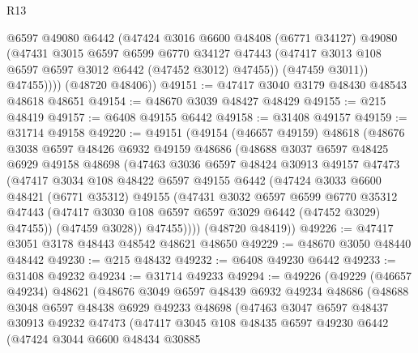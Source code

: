 \begin{lexlean}{R13}
\begin{coremodule}
              @6597
              @49080
              @6442
              (@47424
                @3016
                @6600
                @48408
                (@6771 @34127)
                @49080
                (@47431
                  @3015
                  @6597
                  @6599
                  @6770
                  @34127
                  @47443
                  (@47417 @3013 @108 @6597 @6597 @3012 @6442 (@47452 @3012) @47455))
                (@47459 @3011))
              @47455))))
      (@48720 @48406))
@49151 := @47417 @3040 @3179 @48430 @48543 @48618 @48651
@49154 := @48670 @3039 @48427 @48429
@49155 := @215 @48419
@49157 := @6408 @49155 @6442
@49158 := @31408 @49157
@49159 := @31714 @49158
@49220 := @49151
    (@49154
      (@46657 @49159)
      @48618
      (@48676
        @3038
        @6597
        @48426
        @6932
        @49159
        @48686
        (@48688
          @3037
          @6597
          @48425
          @6929
          @49158
          @48698
          (@47463
            @3036
            @6597
            @48424
            @30913
            @49157
            @47473
            (@47417
              @3034
              @108
              @48422
              @6597
              @49155
              @6442
              (@47424
                @3033
                @6600
                @48421
                (@6771 @35312)
                @49155
                (@47431
                  @3032
                  @6597
                  @6599
                  @6770
                  @35312
                  @47443
                  (@47417 @3030 @108 @6597 @6597 @3029 @6442 (@47452 @3029) @47455))
                (@47459 @3028))
              @47455))))
      (@48720 @48419))
@49226 := @47417 @3051 @3178 @48443 @48542 @48621 @48650
@49229 := @48670 @3050 @48440 @48442
@49230 := @215 @48432
@49232 := @6408 @49230 @6442
@49233 := @31408 @49232
@49234 := @31714 @49233
@49294 := @49226
    (@49229
      (@46657 @49234)
      @48621
      (@48676
        @3049
        @6597
        @48439
        @6932
        @49234
        @48686
        (@48688
          @3048
          @6597
          @48438
          @6929
          @49233
          @48698
          (@47463
            @3047
            @6597
            @48437
            @30913
            @49232
            @47473
            (@47417
              @3045
              @108
              @48435
              @6597
              @49230
              @6442
              (@47424
                @3044
                @6600
                @48434
                @30885

\end{coremodule}
\end{lexlean}
